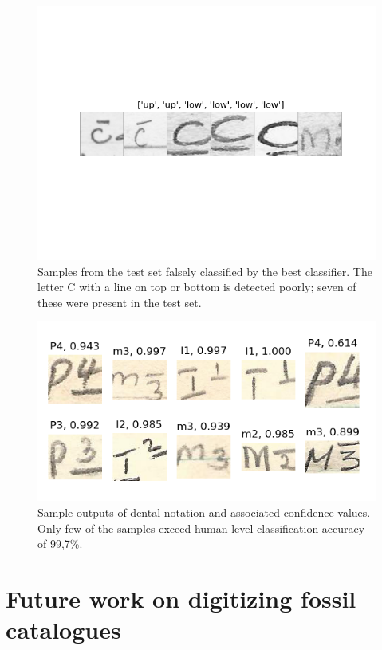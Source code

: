 \documentclass[english,twoside,openright]{UH_DS_MSc}
\begin{document}
\begin{figure}[h]
    \centering
    \includegraphics*[scale=0.8]{images/misclassified_uplow.png}
    \caption{Samples from the test set falsely classified by the best classifier. The letter C with a line on top or bottom is detected poorly; seven of these were present in the test set.}
    \label{image:misclassifications_uplow_in_test}
\end{figure}

\begin{figure}[h]
    \centering
    \includegraphics*[scale=0.8]{images/inference.png}
    \caption{Sample outputs of dental notation and associated confidence values. Only few of the samples exceed human-level classification accuracy of 99,7\%.}
    \label{image:inference}
\end{figure}

\section{Future work on digitizing fossil catalogues}
\end{document}
